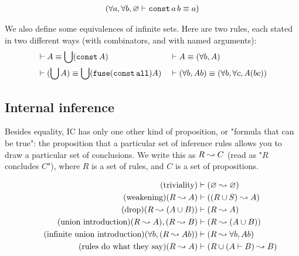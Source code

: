 \documentclass{article}
\begin{document}
  \begin{align*}
    (\forall a, \forall b, \varnothing &\vdash \operatorname{\texttt{const}} a\,b \equiv a)\\
  \end{align*}
  
  We also define some equivalences of infinite sets. Here are two rules, each stated in two different ways (with combinators, and with named arguments):
  \begin{align*}
    &\vdash A \equiv \bigcup (\operatorname{\texttt{const}} A) & &\vdash A \equiv (\forall b, A) \\
    &\vdash (\bigcup A) \equiv \bigcup (\operatorname{\texttt{fuse}} (\operatorname{\texttt{const}} \operatorname{\texttt{all}}) A) & &\vdash (\forall b, Ab) \equiv (\forall b, \forall c, A(bc))\\
  \end{align*}
  
  
  
  \subsection{Internal inference}
  
  Besides equality, IC has only one other kind of proposition, or "formula that can be true": the proposition that a particular set of inference rules allows you to draw a particular set of conclusions.
  We write this as $R \leadsto C$ (read as "$R$ concludes $C$"), where $R$ is a set of rules, and $C$ is a set of propositions.

  \begin{align*}
    \tag{triviality}
    &\vdash (\varnothing \leadsto \varnothing) \\
    \tag{weakening}
    (R \leadsto A) &\vdash ((R \cup S) \leadsto A) \\
    \tag{drop}
    (R \leadsto (A \cup B)) &\vdash (R \leadsto A) \\
    \tag{union introduction}
    (R \leadsto A), (R \leadsto B) &\vdash (R \leadsto (A \cup B)) \\
    \tag{infinite union introduction}
    (\forall b, (R \leadsto Ab)) &\vdash (R \leadsto \forall b, Ab) \\
    \tag{rules do what they say}
    (R \leadsto A) &\vdash (R \cup (A \vdash B) \leadsto B) \\
  \end{align*}
  
\end{document}
